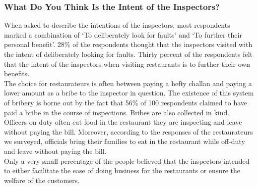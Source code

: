 \documentclass[a4paper, 12pt]{article}
\begin{document}
		
		\subsubsection {What Do You Think Is the Intent of the Inspectors?}
		When asked to describe the intentions of the inspectors, most respondents marked a combination of ‘To deliberately look for faults’ and ‘To further their personal benefit’. 28\% of the respondents thought that the inspectors visited with the intent of deliberately looking for faults. Thirty percent of the respondents felt that the intent of the inspectors when visiting restaurants is to further their own benefits.\\
		The choice for restaurateurs is often between paying a hefty challan and paying a lower amount as a bribe to the inspector in question. The existence of this system of bribery is borne out by the fact that 56\% of 100 respondents claimed to have paid a bribe in the course of inspections. Bribes are also collected in kind. Officers on duty often eat food in the restaurant they are inspecting and leave without paying the bill. Moreover, according to the responses of the restaurateurs we surveyed, officials bring their families to eat in the restaurant while off-duty and leave without paying the bill.\\
		Only a very small percentage of the people believed that the inspectors intended to either facilitate the ease of doing business for the restaurants or ensure the welfare of the customers.

\end{document}
